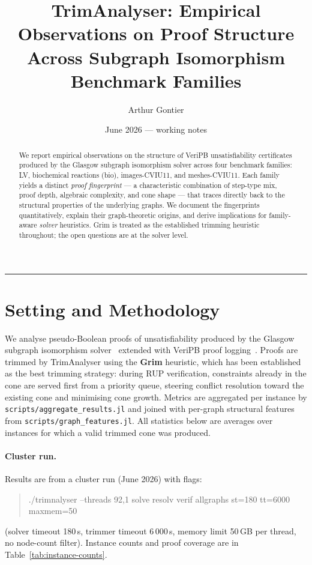 \documentclass[11pt,a4paper]{article}
\title{\textbf{TrimAnalyser: Empirical Observations on Proof Structure\\
Across Subgraph Isomorphism Benchmark Families}}
\author{Arthur Gontier}
\date{June 2026 --- working notes}
\begin{document}
\maketitle

\begin{abstract}
We report empirical observations on the structure of VeriPB unsatisfiability certificates produced by
the Glasgow subgraph isomorphism solver across four benchmark families: LV, biochemical reactions
(bio), images-CVIU11, and meshes-CVIU11.
Each family yields a distinct \emph{proof fingerprint} --- a characteristic combination of step-type
mix, proof depth, algebraic complexity, and cone shape --- that traces directly back to the structural
properties of the underlying graphs.
We document the fingerprints quantitatively, explain their graph-theoretic origins, and derive
implications for family-aware \emph{solver} heuristics.
Grim is treated as the established trimming heuristic throughout; the open questions are at the
solver level.
\end{abstract}

\tableofcontents
\bigskip\hrule\bigskip

\section{Setting and Methodology}

We analyse pseudo-Boolean proofs of unsatisfiability produced by the Glasgow subgraph isomorphism
solver~\cite{glasgow-icgt2020} extended with VeriPB proof
logging~\cite{sip-meets-cp-ijcai2020,e2e-verification-aaai2024}.
Proofs are trimmed by TrimAnalyser using the \textbf{Grim} heuristic, which has been established
as the best trimming strategy: during RUP verification, constraints already in the cone are served
first from a priority queue, steering conflict resolution toward the existing cone and minimising
cone growth.
Metrics are aggregated per instance by \texttt{scripts/aggregate\_results.jl} and joined with
per-graph structural features from \texttt{scripts/graph\_features.jl}.
All statistics below are averages over instances for which a valid trimmed cone was produced.

\paragraph{Cluster run.} Results are from a cluster run (June 2026) with flags:
\begin{quote}\ttfamily
./trimnalyser --threads 92,1 solve resolv verif allgraphs st=180 tt=6000 maxmem=50
\end{quote}
(solver timeout 180\,s, trimmer timeout 6\,000\,s, memory limit 50\,GB per thread,
no node-count filter).
Instance counts and proof coverage are in Table~\ref{tab:instance-counts}.
\end{document}
